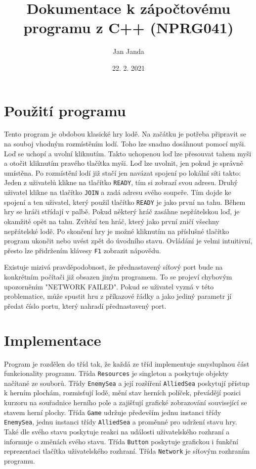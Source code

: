 \documentclass[12pt]{article}
\title{Dokumentace k zápočtovému programu z C++ (NPRG041)}
\date{22. 2. 2021}
\author{Jan Janda}
\begin{document}
 
 \maketitle
 
 \section*{Použití programu}
 
 Tento program je obdobou klasické hry lodě. Na začátku je potřeba připravit se na souboj vhodným rozmístěním lodí. Toho lze snadno dosáhnout pomocí myši. Loď se uchopí a uvolní kliknutím. Takto uchopenou loď lze přesouvat tahem myši a otočit kliknutím pravého tlačítka myši. Loď lze uvolnit, jen pokud je správně umístěna. Po rozmístění lodí již stačí jen navázat spojení po lokální síti takto: Jeden z uživatelů klikne na tlačítko \texttt{READY}, tím si zobrazí svou adresu. Druhý uživatel klikne na tlačítko \texttt{JOIN} a zadá adresu svého soupeře. Tím dojde ke spojení a ten uživatel, který použil tlačítko \texttt{READY} je jako první na tahu. Během hry se hráči střídají v palbě. Pokud některý hráč zasáhne nepřátelskou loď, je okamžitě opět na tahu. Zvítězí ten hráč, který jako první zničí všechny nepřátelské lodě. Po skončení hry je možné kliknutím na příslušné tlačítko program ukončit nebo uvést zpět do úvodního stavu. Ovládání je velmi intuitivní, přesto lze přidržením klávesy \texttt{F1} zobrazit nápovědu.
 
 Existuje mizivá pravděpodobnost, že přednastavený síťový port bude na konkrétním počítači již obsazen jiným programem. To se projeví chybovým upozorněním "NETWORK FAILED". Pokud se uživatel vyzná v této problematice, může spustit hru z příkazové řádky a jako jediný parametr jí předat číslo portu, který nahradí přednastavený port.

 \section*{Implementace}
 
 Program je rozdělen do tříd tak, že každá ze tříd implementuje smysluplnou část funkcionality programu. Třída \texttt{Resources} je singleton a poskytuje objekty načítané ze souborů. Třídy \texttt{EnemySea} a její rozšíření \texttt{AlliedSea} poskytují přístup k herním plochám, rozmisťují lodě, mění stav herních políček, převádějí pozici kurzoru na souřadnice herního pole a zajišťují grafické zobrazování související se stavem herní plochy. Třída \texttt{Game} udržuje především jednu instanci třídy \texttt{EnemySea}, jednu instanci třídy \texttt{AlliedSea} a proměnné pro udržení stavu hry. Také dle svého stavu poskytuje reakci na události uživatelského rozhraní a informuje o změnách svého stavu. Třída \texttt{Button} poskytuje grafickou i funkční reprezentaci tlačítka uživatelského rozhraní. Třída \texttt{Network} je síťovým rozhraním programu.
 
\end{document}
